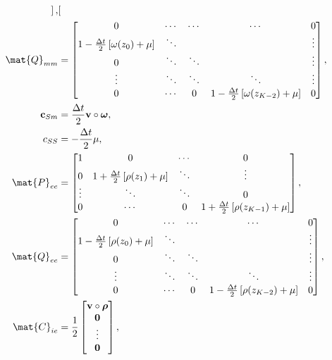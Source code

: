 \documentclass{jpmarticle}
\renewcommand{\vec}[1]{\boldsymbol{\mathrm{#1}}}
\let\subequationsorig\subequations%
\let\endsubequationsorig\endsubequations%
\renewenvironment{subequations}{
  \subequationsorig
  \renewcommand{\theequation}{\theparentequation.\arabic{equation}}
}{
  \endsubequationsorig
}
\begin{document}
\begin{subequations}
\begin{align}
\begin{bmatrix}
    \end{bmatrix},
    \\
    \mat{Q}_{mm} &=
    \begin{bmatrix}
      0 & \cdots & \cdots & \cdots & 0
      \\
      1 - \frac{\Delta t}{2} \left[\omega(z_0) + \mu\right] & \ddots &
      & & \vdots
      \\
      0 & \ddots & \ddots & & \vdots
      \\
      \vdots & \ddots & \ddots & \ddots & \vdots
      \\
      0 & \cdots & 0 &
      1 - \frac{\Delta t}{2} \left[\omega(z_{K - 2}) + \mu\right] & 0
    \end{bmatrix},
    \\
    \vec{c}_{Sm} &=
    \frac{\Delta t}{2} \vec{v} \circ \vec{\omega},
    \\
    c_{SS} &= - \frac{\Delta t}{2} \mu,
    \\
    \mat{P}_{ee} &=
    \begin{bmatrix}
      1 & 0 & \cdots & 0
      \\
      0 & 1 + \frac{\Delta t}{2} \left[\rho(z_1) + \mu\right] &
      \ddots & \vdots
      \\
      \vdots & \ddots & \ddots & 0
      \\
      0 & \cdots & 0 &
      1 + \frac{\Delta t}{2} \left[\rho(z_{K - 1}) + \mu\right]
    \end{bmatrix},
    \\
    \mat{Q}_{ee} &=
    \begin{bmatrix}
      0 & \cdots & \cdots & \cdots & 0
      \\
      1 - \frac{\Delta t}{2} \left[\rho(z_0) + \mu\right] & \ddots &
      & & \vdots
      \\
      0 & \ddots & \ddots & & \vdots
      \\
      \vdots & \ddots & \ddots & \ddots & \vdots
      \\
      0 & \cdots & 0 &
      1 - \frac{\Delta t}{2} \left[\rho(z_{K - 2}) + \mu\right] & 0
    \end{bmatrix},
    \\
    \mat{C}_{ie} &=
    \frac{1}{2}
    \begin{bmatrix}
      \vec{v} \circ \vec{\rho}
      \\
      \vec{0}
      \\
      \vdots
      \\
      \vec{0}
    \end{bmatrix},

\end{align}
\end{subequations}
\end{document}
